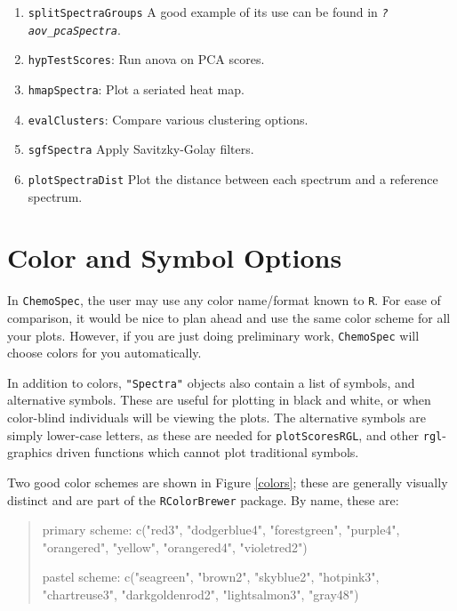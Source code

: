 \documentclass[letter,10pt,twocolumn,twoside,printwatermark=false]{pinp}
\begin{document}
\begin{enumerate}
  \item \texttt{splitSpectraGroups}  A good example of its use can be found in \texttt{\textsl{?aov\_pcaSpectra}}.
  \item \texttt{hypTestScores}: Run anova on PCA scores.
  \item \texttt{hmapSpectra}: Plot a seriated heat map.
  \item \texttt{evalClusters}: Compare various clustering options.
  \item \texttt{sgfSpectra} Apply Savitzky-Golay filters.
  \item \texttt{plotSpectraDist} Plot the distance between each spectrum and a reference spectrum.

\end{enumerate}

\hypertarget{color-and-symbol-options}{%
\section{\texorpdfstring{Color and Symbol Options
\label{ColSym}}{Color and Symbol Options }}\label{color-and-symbol-options}}

In \texttt{ChemoSpec}, the user may use any color name/format known to
\texttt{R}. For ease of comparison, it would be nice to plan ahead and
use the same color scheme for all your plots. However, if you are just
doing preliminary work, \texttt{ChemoSpec} will choose colors for you
automatically.

In addition to colors, \texttt{"Spectra"} objects also contain a list of
symbols, and alternative symbols. These are useful for plotting in black
and white, or when color-blind individuals will be viewing the plots.
The alternative symbols are simply lower-case letters, as these are
needed for \texttt{plotScoresRGL}, and other \texttt{rgl}-graphics
driven functions which cannot plot traditional symbols.

Two good color schemes are shown in Figure \ref{colors}; these are
generally visually distinct and are part of the \texttt{RColorBrewer}
package. By name, these are:

\begin{quote}
primary scheme: c("red3", "dodgerblue4", "forestgreen", "purple4", "orangered", "yellow", "orangered4", "violetred2")

pastel scheme: c("seagreen", "brown2", "skyblue2", "hotpink3", "chartreuse3", "darkgoldenrod2", "lightsalmon3", "gray48")
\end{quote}
\end{document}
